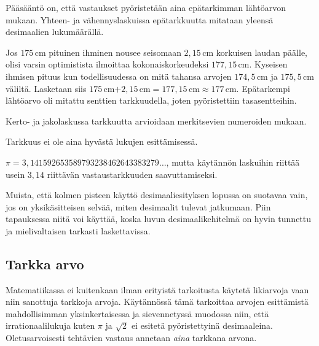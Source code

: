 Pääsääntö on, että vastaukset pyöristetään aina epätarkimman lähtöarvon mukaan. Yhteen- ja vähennyslaskuissa epätarkkuutta mitataan yleensä desimaalien lukumäärällä.

\begin{esimerkki} Jos $175$\,cm pituinen ihminen nousee seisomaan $2,15$\,cm korkuisen laudan päälle, olisi varsin optimistista ilmoittaa kokonaiskorkeudeksi $177,15$\,cm. Kyseisen ihmisen pituus kun todellisuudessa on mitä tahansa arvojen $174,5$\,cm ja $175,5$\,cm väliltä. Lasketaan siis $175$\,cm$+2,15$\,cm$=177,15$\,cm$\approx 177$\,cm. 
Epätarkempi lähtöarvo oli mitattu senttien tarkkuudella, joten pyöristettiin tasasentteihin.
\end{esimerkki}

Kerto- ja jakolaskussa tarkkuutta arvioidaan merkitsevien numeroiden mukaan.


Tarkkuus ei ole aina hyvästä lukujen esittämisessä.

\newpage %
\begin{esimerkki}
$\pi = 3,141592653589793238462643383279 \ldots$, mutta käytännön laskuihin riittää usein $3,14$ riittävän vastaustarkkuuden saavuttamiseksi.
\end{esimerkki}

Muista, että kolmen pisteen käyttö desimaaliesityksen lopussa on suotavaa vain, jos on yksikäsitteisen selvää, miten desimaalit tulevat jatkumaan. Piin tapauksessa niitä voi käyttää, koska luvun desimaalikehitelmä on hyvin tunnettu ja mielivaltaisen tarkasti laskettavissa.

\subsection{Tarkka arvo}

Matematiikassa ei kuitenkaan ilman erityistä tarkoitusta käytetä likiarvoja vaan niin sanottuja tarkkoja arvoja. Käytännössä tämä tarkoittaa arvojen esittämistä mahdollisimman yksinkertaisessa ja sievennetyssä muodossa niin, että irrationaalilukuja kuten $\pi$ ja $\sqrt{2}$ ei esitetä pyöristettyinä desimaaleina. Oletusarvoisesti tehtävien vastaus annetaan \textit{aina} tarkkana arvona.

